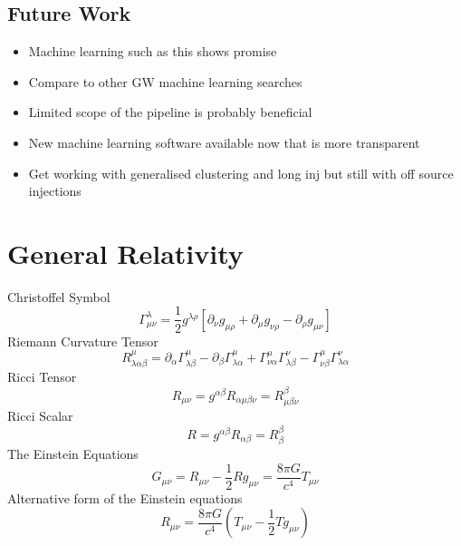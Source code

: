 \documentclass[11pt]{cuthesis}
\newcommand{\mn}{_{\mu\nu}}
\begin{document}
\subsection{Future Work}
\begin{itemize}
\item Machine learning such as this shows promise
\item Compare to other GW machine learning searches
\item Limited scope of the pipeline is probably beneficial
\item New machine learning software available now that is more transparent
\item Get working with generalised clustering and long inj but still with off source injections
\end{itemize}


\appendix
\appendixpage
\addappheadtotoc
\section{General Relativity}

Christoffel Symbol
\begin{equation} \label{christ}
\Gamma^\lambda\mn=\frac{1}{2}g^{\lambda \rho} [\partial_\nu g_{\mu \rho} + \partial_\mu g_{\nu \rho}-\partial_\rho g\mn]
\end{equation}
Riemann Curvature Tensor  
\begin{equation} \label{rct}
R^\mu_{\lambda \alpha \beta} = \partial_\alpha \Gamma^\mu_{\lambda \beta} -\partial_\beta \Gamma^\mu_{\lambda \alpha} + \Gamma^\mu_{\nu \alpha} \Gamma^\nu_{\lambda \beta} - \Gamma^\mu_{\nu \beta} \Gamma^\nu_{\lambda \alpha}
\end{equation}
Ricci Tensor
\begin{equation} \label{rt}
R\mn=g^{\alpha \beta} R_{\alpha \mu \beta \nu}=R^\beta_{\mu \beta \nu}
\end{equation}
Ricci Scalar
\begin{equation} \label{rs}
R=g^{\alpha \beta}R_{\alpha \beta}=R^\beta_\beta
\end{equation}
The Einstein Equations
\begin{equation} \label{eineq}
G\mn =R\mn -\frac{1}{2} R g\mn=\frac{8 \pi G}{c^4}T\mn
\end{equation}
Alternative form of the Einstein equations
\begin{equation} \label{alt einstein}
R\mn = \frac{8 \pi G}{c^4}\left( T\mn - \frac{1}{2}Tg\mn \right) 
\end{equation}

\backmatter
\end{document}
